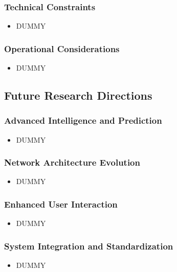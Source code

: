 \documentclass[11pt,twocolumn]{article}
\begin{document}
\subsubsection{Technical Constraints}
\begin{itemize}
\item DUMMY
\end{itemize}

\subsubsection{Operational Considerations}
\begin{itemize}
\item DUMMY
\end{itemize}

\subsection{Future Research Directions}

\subsubsection{Advanced Intelligence and Prediction}
\begin{itemize}
\item DUMMY
\end{itemize}

\subsubsection{Network Architecture Evolution}
\begin{itemize}
\item DUMMY
\end{itemize}

\subsubsection{Enhanced User Interaction}
\begin{itemize}
\item DUMMY
\end{itemize}

\subsubsection{System Integration and Standardization}
\begin{itemize}
\item DUMMY
\end{itemize}
\end{document}
